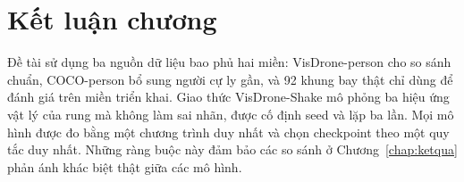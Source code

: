\section{Kết luận chương}

Đề tài sử dụng ba nguồn dữ liệu bao phủ hai miền: VisDrone-person cho so sánh chuẩn, COCO-person bổ sung người cự ly gần, và 92 khung bay thật chỉ dùng để đánh giá trên miền triển khai. Giao thức VisDrone-Shake mô phỏng ba hiệu ứng vật lý của rung mà không làm sai nhãn, được cố định seed và lặp ba lần. Mọi mô hình được đo bằng một chương trình duy nhất và chọn checkpoint theo một quy tắc duy nhất. Những ràng buộc này đảm bảo các so sánh ở Chương~\ref{chap:ketqua} phản ánh khác biệt thật giữa các mô hình.
